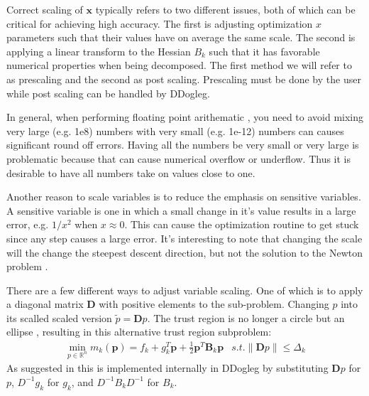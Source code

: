 \documentclass[peerreview,compsoc,onecolumn]{IEEEtran}
\newcommand{\R}{\mathbb{R}}
\newcommand{\norm}[1]{\left\lVert#1\right\rVert}
\begin{document}
Correct scaling of $\bm{x}$ typically refers to two different issues, both of which can be critical for achieving high accuracy. The first is adjusting optimization $x$ parameters such that their values have on average the same scale. The second is applying a linear transform to the Hessian $B_k$ such that it has favorable numerical properties when being decomposed. The first method we will refer to as prescaling and the second as post scaling. Prescaling must be done by the user while post scaling can be handled by DDogleg.

In general, when performing floating point arithematic \cite{goldberg1991every}, you need to avoid mixing very large (e.g. 1e8) numbers with very small (e.g. 1e-12) numbers can causes significant round off errors. Having all the numbers be very small or very large is problematic because that can cause numerical overflow or underflow. Thus it is desirable to have all numbers take on values close to one.

Another reason to scale variables is to reduce the emphasis on sensitive variables. A sensitive variable is one in which a small change in it's value results in a large error, e.g. $1/x^2$ when $x \approx 0$. This can cause the optimization routine to get stuck since any step causes a large error. It's interesting to note that changing the scale will the change the steepest descent direction, but not the solution to the Newton problem \cite{dennis1996}.

There are a few different ways to adjust variable scaling. One of which is to apply a diagonal matrix $\bm{D}$ with positive elements to the sub-problem. Changing $p$ into its scalled scaled version $\tilde{p} = \bm{D}p$. The trust region is no longer a circle but an ellipse \cite{numopt2006}, resulting in this alternative trust region subproblem:
\begin{equation}
\begin{array}{lr}
\min\limits_{p\in \R^n} m_k(\bm{p}) = f_k + g^T_k \bm{p} + \frac{1}{2}\bm{p}^T \bm{B}_k \bm{p} & s.t. \norm{\bm{D}p} \le \Delta_k
\end{array}
\end{equation}
As suggested in \cite{numopt2006} this is implemented internally in DDogleg by substituting $\bm{D}p$ for $p$, $D^{-1}g_k$ for $g_k$, and $D^{-1}B_k D^{-1}$ for $B_k$.  
\end{document}
